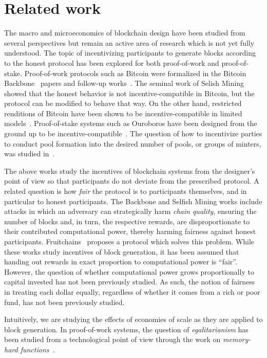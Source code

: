 \section{Related work}\label{sec:related}
The macro and microeconomics of blockchain design have
been studied from several perspectives but remain an active area of research
which is not yet fully understood. The topic of incentivizing participants to
generate blocks according to the honest protocol has been explored for both
proof-of-work and proof-of-stake. Proof-of-work protocols such as Bitcoin were
formalized in the Bitcoin Backbone~\cite{backbone1,backbone2} papers and
follow-up works~\cite{pass}. The seminal work of Selish Mining~\cite{selfish}
showed that the honest behavior is not incentive-compatible in Bitcoin, but the
protocol can be modified to behave that way. On the other hand, restricted
renditions of Bitcoin have been shown to be incentive-compatible in limited
models~\cite{tselekounis-kiayias}. Proof-of-stake systems such as Ouroboros
have been designed from the ground up to be
incentive-compatible~\cite{ouroboros}. The question of how to incentivize
parties to conduct pool formation into the desired number of pools, or groups of minters, was studied
in~\cite{stouka-koutsoupias-kiayias}.

The above works study the incentives of blockchain systems from the designer's
point of view so that participants do not deviate from the prescribed protocol.
A related question is how \emph{fair} the protocol is to participants
themselves, and in particular to honest participants. The Backbone and Selfish
Mining works include attacks in which an adversary can strategically harm
\emph{chain quality}, ensuring the number of blocks and, in turn, the respective
rewards, are disproportionate to their contributed computational power, thereby
harming fairness against honest participants. Fruitchains~\cite{fruitchains}
proposes a protocol which solves this problem.
While these works study incentives of block generation, it has been
assumed that handing out rewards in exact proportion to computational power is
``fair''. However, the question of whether computational power grows proportionally
to capital invested has not been previously studied. As such, the notion of
fairness in treating each dollar equally, regardless of whether it comes from a
rich or poor fund, has not been previously studied.

Intuitively, we are studying the effects of economies of scale as they are
applied to block generation.
In proof-of-work systems, the question of \emph{egalitarianism} has been studied
from a technological point of view through the work on \emph{memory-hard functions}~\cite{pebbling}.

